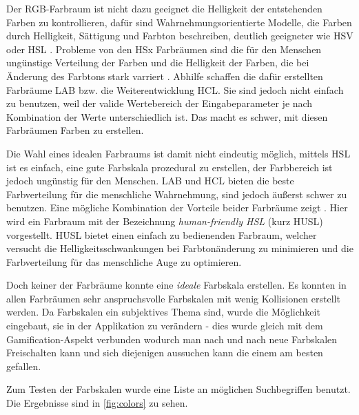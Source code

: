 \documentclass[12pt,twoside]{book}
\begin{document}
Der RGB-Farbraum ist nicht dazu geeignet die Helligkeit der entstehenden Farben zu kontrollieren, dafür sind Wahrnehmungsorientierte Modelle, die Farben durch Helligkeit, Sättigung und Farbton beschreiben, deutlich geeigneter wie HSV oder HSL \cite{meier2004interactive}.
Probleme von den HSx Farbräumen sind die für den Menschen ungünstige Verteilung der Farben und die Helligkeit der Farben, die bei Änderung des Farbtons stark varriert \cite{husl}.
Abhilfe schaffen die dafür erstellten Farbräume LAB bzw. die Weiterentwicklung HCL. Sie sind jedoch nicht einfach zu benutzen, weil der valide Wertebereich der Eingabeparameter je nach Kombination der Werte unterschiedlich ist. Das macht es schwer, mit diesen Farbräumen Farben zu erstellen.

Die Wahl eines idealen Farbraums ist damit nicht eindeutig möglich, mittels HSL ist es einfach, eine gute Farbskala prozedural zu erstellen, der Farbbereich ist jedoch ungünstig für den Menschen. LAB und HCL bieten die beste Farbverteilung für die menschliche Wahrnehmung, sind jedoch äußerst schwer zu benutzen. Eine mögliche Kombination der Vorteile beider Farbräume zeigt \citep{husl}. Hier wird ein Farbraum mit der Bezeichnung \textit{human-friendly HSL} (kurz HUSL) vorgestellt. HUSL bietet einen einfach zu bedienenden Farbraum, welcher versucht die Helligkeitsschwankungen bei Farbtonänderung zu minimieren und die Farbverteilung für das menschliche Auge zu optimieren.

Doch keiner der Farbräume konnte eine \textit{ideale} Farbskala erstellen. Es konnten in allen Farbräumen sehr anspruchsvolle Farbskalen mit wenig Kollisionen erstellt werden. Da Farbskalen ein subjektives Thema sind, wurde die Möglichkeit eingebaut, sie in der Applikation zu verändern - dies wurde gleich mit dem Gamification-Aspekt verbunden wodurch man nach und nach neue Farbskalen Freischalten kann und sich diejenigen aussuchen kann die einem am besten gefallen.

Zum Testen der Farbskalen wurde eine Liste an möglichen Suchbegriffen benutzt. Die Ergebnisse sind in \ref{fig:colors} zu sehen.
\end{document}
